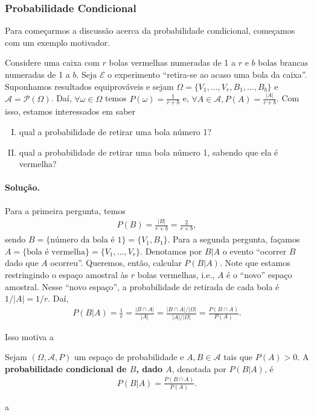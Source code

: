 \documentclass[../Notas.tex]{subfiles}
\begin{document}
\subsubsection{Probabilidade Condicional}
Para começarmos a discussão acerca da probabilidade condicional, começamos com um exemplo motivador.
\begin{example}
Considere uma caixa com $r$ bolas vermelhas numeradas de 1 a $r$ e $b$ bolas brancas numeradas de 1 a $b$. Seja $\mathcal{E}$ o experimento ``retira-se ao acaso uma bola da caixa''. Suponhamos resultados equiprováveis e sejam $\Omega = \{ V_1, \dots, V_r, B_1, \dots, B_b \}$ e $\mathcal{A} = \mathcal{P}(\Omega)$. Daí, $\forall \omega\in\Omega$ temos $P(\omega) = \displaystyle{\frac{1}{r+b}}$ e, $\forall A\in\mathcal{A}, P(A) = \displaystyle{\frac{|A|}{r+b}}$. Com isso, estamos interessados em saber
\begin{enumerate}[(I)]
    \item qual a probabilidade de retirar uma bola número 1?
    \item qual a probabilidade de retirar uma bola número 1, sabendo que ela é vermelha?
\end{enumerate}
\paragraph{Solução.} Para a primeira pergunta, temos
\begin{align*}
    P(B) = \frac{|B|}{r+b} = \frac{2}{r+b},
\end{align*}
sendo $B = \{ \text{número da bola é } 1 \} = \{V_1, B_1\}$. Para a segunda pergunta, façamos $A = \{ \text{bola é vermelha} \} = \{ V_1, \dots, V_r \}$. Denotamos por $B|A$ o evento ``ocorrer $B$ dado que $A$ ocorreu''. Queremos, então, calcular $P(B|A)$. Note que estamos restringindo o espaço amostral às $r$ bolas vermelhas, i.e., $A$ é o ``novo'' espaço amostral. Nesse ``novo espaço'', a probabilidade de retirada de cada bola é $1/|A| = 1/r$. Daí,
\begin{align*}
    P(B|A) = \frac{1}{r} = \frac{|B\cap A|}{|A|} = \frac{|B\cap A|/|\Omega|}{|A|/|\Omega|} = \frac{P(B\cap A)}{P(A)}.
\end{align*}
\end{example}

Isso motiva a
\begin{definition}
Sejam $(\Omega, \mathcal{A}, P)$ um espaço de probabilidade e $A, B\in\mathcal{A}$ tais que $P(A) > 0$. A \textbf{probabilidade condicional de $B$, dado $A$}, denotada por $P(B|A)$, é
\begin{align*}
    P(B|A) = \frac{P(B\cap A)}{P(A)}.
\end{align*}
\end{definition}

\begin{remarks}
a
\end{remarks}
\end{document}

